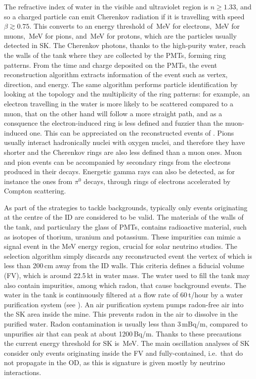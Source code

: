 The refractive index of water in the visible and ultraviolet region is $n \geq 1.33$, %
and so a charged particle can emit Cherenkov radiation if it is travelling %
with speed $\beta \gtrsim 0.75$.
This converts to an energy threshold of \,MeV for electrons, \,MeV for muons, %
\,MeV for pions, and \,MeV for protons, which are the particles usually detected in SK.
The Cherenkov photons, thanks to the high-purity water, reach the walls of the tank where they %
are collected by the PMTs, forming ring patterns.
From the time and charge deposited on the PMTs, the event reconstruction algorithm extracts information of the event %
such as vertex, direction, and energy.
The same algorithm performs particle identification by looking at the topology and the multiplicity of the ring patterns: %
for example, an electron travelling in the water is more likely to be scattered compared to a muon, %
that on the other hand will follow a more straight path, and as a consquence %
the electron-induced ring is less defined and fuzzier than the muon-induced one.
This can be appreciated on the reconstructed events of .
Pions usually interact hadronically nuclei with oxygen nuclei, and therefore they have shorter %
and the Cherenkov rings are also less defined than a muon ones.
Muon and pion events can be accompanied by secondary rings from the electrons produced in their decays.
Energetic gamma rays can also be detected, as for instance the ones from $\pi^0$ decays, %
through rings of electrons accelerated by Compton scattering.


As part of the strategies to tackle backgrounds, typically only events originating at the centre %
of the ID are considered to be valid.
The materials of the walls of the tank, and particulary the glass of PMTs, contains radioactive material, %
such as isotopes of thorium, uranium and potassium.
These impurities can mimic a signal event in the MeV energy region, crucial for solar neutrino studies.
The selection algorithm simply discards any reconstructed event the vertex of which is less than 200\,cm away from the ID walls.
This criteria defines a fiducial volume (FV), which is around 22.5\,kt in water mass.
The water used to fill the tank may also contain impurities, among which radon, that cause background events.
The water in the tank is continuously filtered at a flow rate of 60\,t/hour by a water purification system (see ).
An air purification system pumps radon-free air into the SK area inside the mine.
This prevents radon in the air to dissolve in the purified water.
Radon contamination is usually less than 3\,mBq/m, compared to unpurifies air that can peak %
at about 1200\,Bq/m.
Thanks to these precautions the current energy threshold for SK is \,MeV.
The main oscillation analyses of SK consider only events originating inside the FV and fully-contained, %
i.e.\ that do not propagate in the OD, as this is signature is given mostly by neutrino interactions.

